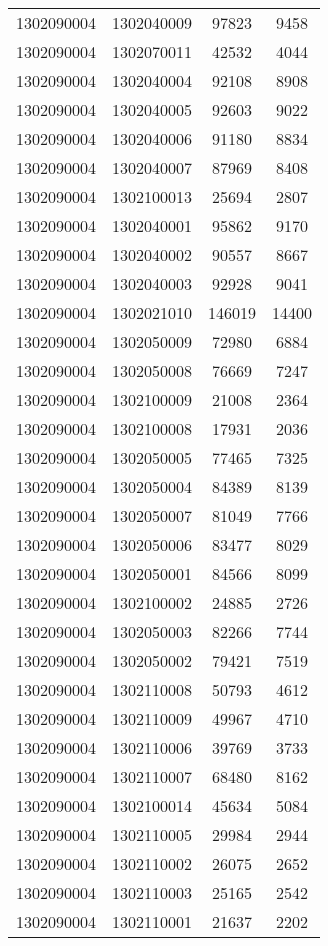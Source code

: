 \begin{longtable}[h]{llcc}
		1302090004 & 1302040009 & 97823 & 9458\\
		1302090004 & 1302070011 & 42532 & 4044\\
		1302090004 & 1302040004 & 92108 & 8908\\
		1302090004 & 1302040005 & 92603 & 9022\\
		1302090004 & 1302040006 & 91180 & 8834\\
		1302090004 & 1302040007 & 87969 & 8408\\
		1302090004 & 1302100013 & 25694 & 2807\\
		1302090004 & 1302040001 & 95862 & 9170\\
		1302090004 & 1302040002 & 90557 & 8667\\
		1302090004 & 1302040003 & 92928 & 9041\\
		1302090004 & 1302021010 & 146019 & 14400\\
		1302090004 & 1302050009 & 72980 & 6884\\
		1302090004 & 1302050008 & 76669 & 7247\\
		1302090004 & 1302100009 & 21008 & 2364\\
		1302090004 & 1302100008 & 17931 & 2036\\
		1302090004 & 1302050005 & 77465 & 7325\\
		1302090004 & 1302050004 & 84389 & 8139\\
		1302090004 & 1302050007 & 81049 & 7766\\
		1302090004 & 1302050006 & 83477 & 8029\\
		1302090004 & 1302050001 & 84566 & 8099\\
		1302090004 & 1302100002 & 24885 & 2726\\
		1302090004 & 1302050003 & 82266 & 7744\\
		1302090004 & 1302050002 & 79421 & 7519\\
		1302090004 & 1302110008 & 50793 & 4612\\
		1302090004 & 1302110009 & 49967 & 4710\\
		1302090004 & 1302110006 & 39769 & 3733\\
		1302090004 & 1302110007 & 68480 & 8162\\
		1302090004 & 1302100014 & 45634 & 5084\\
		1302090004 & 1302110005 & 29984 & 2944\\
		1302090004 & 1302110002 & 26075 & 2652\\
		1302090004 & 1302110003 & 25165 & 2542\\
		1302090004 & 1302110001 & 21637 & 2202\\

\end{longtable}
